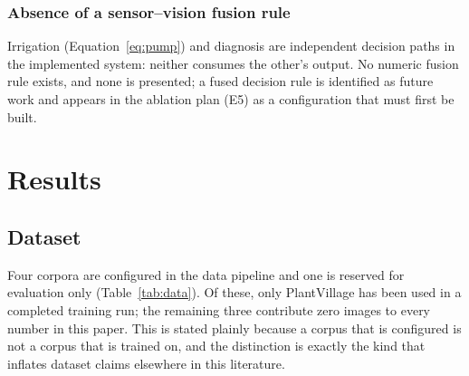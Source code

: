 \documentclass[journal]{IEEEtran}
\begin{document}
\subsubsection{Absence of a sensor--vision fusion rule}
Irrigation (Equation~\ref{eq:pump}) and diagnosis are independent decision
paths in the implemented system: neither consumes the other's output. No
numeric fusion rule exists, and none is presented; a fused decision rule is
identified as future work and appears in the ablation plan (E5) as a
configuration that must first be built.

\section{Results}
\label{sec:results}

\subsection{Dataset}
\label{sec:dataset}

Four corpora are configured in the data pipeline and one is reserved for
evaluation only (Table~\ref{tab:data}). Of these, only PlantVillage
\cite{hughes2015plantvillage} has been used in a completed training run;
the remaining three contribute zero images to every number in this paper.
This is stated plainly because a corpus that is configured is not a corpus
that is trained on, and the distinction is exactly the kind that inflates
dataset claims elsewhere in this literature.
\end{document}
